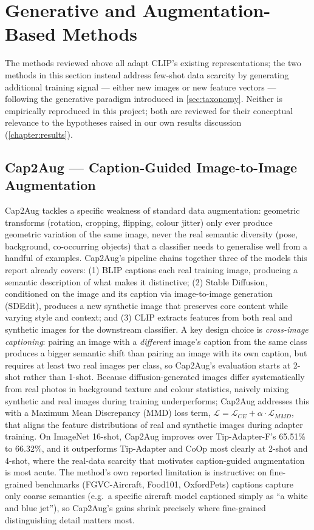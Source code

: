 \documentclass{iutbscthesis}
\begin{document}
\section{Generative and Augmentation-Based Methods} \label{sec:generativemethods}

The methods reviewed above all adapt CLIP's existing representations; the two methods in this section instead address few-shot data scarcity by generating additional training signal --- either new images or new feature vectors --- following the generative paradigm introduced in \autoref{sec:taxonomy}. Neither is empirically reproduced in this project; both are reviewed for their conceptual relevance to the hypotheses raised in our own results discussion (\autoref{chapter:results}).

\subsection{Cap2Aug --- Caption-Guided Image-to-Image Augmentation}
Cap2Aug \cite{sharma2024cap2aug} tackles a specific weakness of standard data augmentation: geometric transforms (rotation, cropping, flipping, colour jitter) only ever produce geometric variation of the same image, never the real semantic diversity (pose, background, co-occurring objects) that a classifier needs to generalise well from a handful of examples. Cap2Aug's pipeline chains together three of the models this report already covers: (1) BLIP \cite{li2022blip} captions each real training image, producing a semantic description of what makes it distinctive; (2) Stable Diffusion, conditioned on the image and its caption via image-to-image generation (SDEdit), produces a new synthetic image that preserves core content while varying style and context; and (3) CLIP \cite{radford2021clip} extracts features from both real and synthetic images for the downstream classifier. A key design choice is \emph{cross-image captioning}: pairing an image with a \emph{different} image's caption from the same class produces a bigger semantic shift than pairing an image with its own caption, but requires at least two real images per class, so Cap2Aug's evaluation starts at 2-shot rather than 1-shot. Because diffusion-generated images differ systematically from real photos in background texture and colour statistics, naively mixing synthetic and real images during training underperforms; Cap2Aug addresses this with a Maximum Mean Discrepancy (MMD) loss term, $\mathcal{L} = \mathcal{L}_{CE} + \alpha \cdot \mathcal{L}_{MMD}$, that aligns the feature distributions of real and synthetic images during adapter training. On ImageNet 16-shot, Cap2Aug improves over Tip-Adapter-F's 65.51\% to 66.32\%, and it outperforms Tip-Adapter and CoOp most clearly at 2-shot and 4-shot, where the real-data scarcity that motivates caption-guided augmentation is most acute. The method's own reported limitation is instructive: on fine-grained benchmarks (FGVC-Aircraft, Food101, OxfordPets) captions capture only coarse semantics (e.g.\ a specific aircraft model captioned simply as ``a white and blue jet''), so Cap2Aug's gains shrink precisely where fine-grained distinguishing detail matters most.
\end{document}
